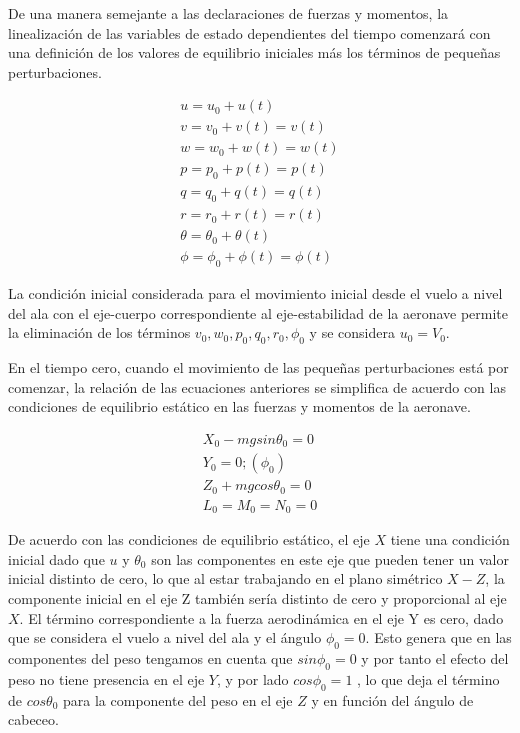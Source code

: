 De una manera semejante a las declaraciones de fuerzas y momentos, la linealización de las variables de estado dependientes del tiempo comenzará con una definición de los valores de equilibrio iniciales más los términos de pequeñas perturbaciones.

\begin{gather}
    u = u_0 + u(t) \\
    v = v_0 + v(t) = v(t) \\
    w = w_0 + w(t) = w(t) \\
    p = p_0 + p(t) = p(t) \\
    q = q_0 + q(t) = q(t)  \\
    r = r_0 + r(t) = r(t) \\
    \theta = \theta_0 + \theta(t) \\
    \phi = \phi_0 + \phi(t) = \phi(t) 
\end{gather}

La condición inicial considerada para el movimiento inicial desde el vuelo a nivel del ala con el eje-cuerpo correspondiente al eje-estabilidad de la aeronave permite la eliminación de los términos $v_0, w_0, p_0, q_0, r_0, \phi_0$ y se considera $u_0 = V_0$.

En el tiempo cero, cuando el movimiento de las pequeñas perturbaciones está por comenzar, la relación de las ecuaciones anteriores se simplifica de acuerdo con las condiciones de equilibrio estático en las fuerzas y momentos de la aeronave.

\begin{gather}
    X_0 - mg sin\theta_0 = 0 \\
    Y_0 = 0; (\phi_0) \\
    Z_0 + mg cos\theta_0 = 0 \\
    L_0 = M_0 = N_0 = 0
\end{gather}

De acuerdo con las condiciones de equilibrio estático, el eje $X$ tiene una condición inicial dado que $u$ y $\theta_0$ son las componentes en este eje que pueden tener un valor inicial distinto de cero, lo que al estar trabajando en el plano simétrico $X-Z$, la componente inicial en el eje Z también sería distinto de cero y proporcional al eje $X$. El término correspondiente a la fuerza aerodinámica en el eje Y es cero, dado que se considera el vuelo a nivel del ala y el ángulo $\phi_0=0$. Esto genera que en las componentes del peso tengamos en cuenta que $sin \phi_0 = 0$ y por tanto el efecto del peso no tiene presencia en el eje $Y$, y por lado $cos \phi_0 = 1$ , lo que deja el término de $cos \theta_0$ para la componente del peso en el eje $Z$ y en función del ángulo de cabeceo. 

